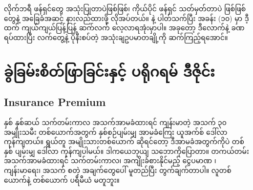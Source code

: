 လိုက်ဘရီ ဖန်ရှင်တွေ အသုံးပြုတာပဲဖြစ်ဖြစ်၊ ကိုယ်ပိုင် ဖန်ရှင် သတ်မှတ်တာပဲ ဖြစ်ဖြစ်  တွေနဲ့   အခြေခံအဆင့် နားလည်ထားဖို့ လိုအပ်တယ်။  နဲ့ ပါတ်သက်ပြီး အခန်း (၁၀)  မှာ ဒီ့ထက် ကျယ်ကျယ်ပြန့်ပြန့် ဆက်လက် လေ့လာရအုံးမှာပါ။  အခုတော့ ဒီလောက်နဲ့ ခဏရပ်ထားပြီး လက်တွေ့နဲ့ ပိုနီးစပ်တဲ့  အသုံးချဥပမာတချို့ကို ဆက်ကြည့်ရအောင်။

\section{ခွဲခြမ်းစိတ်ဖြာခြင်းနှင့် ပရိုဂရမ် ဒီဇိုင်း}

\subsection*{Insurance Premium}
နှစ် နှစ်ဆယ် သက်တမ်းကာလ  အသက်အာမခံထားရင် ကျန်းမာတဲ့ အသက် ၃၀ အမျိုးသမီး တစ်ယောက်အတွက် နှစ်စဉ်ပျမ်းမျှ အာမခံကြေး   ယူအက်စ် ဒေါ်လာ ကုန်ကျတယ်။ ရွယ်တူ အမျိုးသားတစ်ယောက် ဆိုရင်တော့ ဒီအာမခံအတွက်ကိုပဲ တစ်နှစ် ပျမ်းမျှ  ဒေါ်လာ ကုန်ကျပါမယ်။ ဒါကယေဘုယျ သဘောကိုပြောတာ။ တကယ်တမ်း အသက်အာမခံထားရင် သက်တမ်းကာလ၊ အကျိုးခံစားနိုင်မည့် ငွေပမာဏ ၊ ကျန်းမာရေး၊ အသက်  စတဲ့ အချက်တွေပေါ် မူတည်ပြီး တွက်ချက်တာပါ။ လူတစ်ယောက်နဲ့ တစ်ယောက် ပရီမီယံ မတူဘူး။



